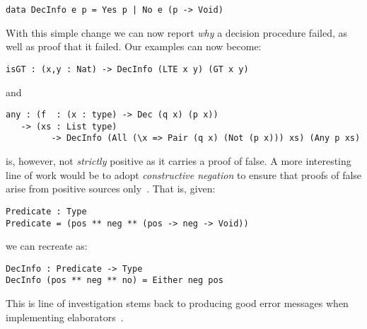 \begin{verbatim}
data DecInfo e p = Yes p | No e (p -> Void)
\end{verbatim}

With this simple change we can now report \emph{why} a decision procedure failed, as well as proof that it failed.
Our examples can now become:

\begin{verbatim}
isGT : (x,y : Nat) -> DecInfo (LTE x y) (GT x y)
\end{verbatim}

\noindent
and

\begin{verbatim}
any : (f  : (x : type) -> Dec (q x) (p x))
   -> (xs : List type)
         -> DecInfo (All (\x => Pair (q x) (Not (p x))) xs) (Any p xs)
\end{verbatim}



 is, however, not \emph{strictly} positive as it carries a proof of false.
A more interesting line of work would be to adopt \emph{constructive negation} to ensure that proofs of false arise from positive sources only~\cite{msfp/Atkey22}.
That is, given:

\begin{verbatim}
Predicate : Type
Predicate = (pos ** neg ** (pos -> neg -> Void))
\end{verbatim}

we can recreate  as:

\begin{verbatim}
DecInfo : Predicate -> Type
DecInfo (pos ** neg ** no) = Either neg pos
\end{verbatim}

This is line of investigation stems back to
producing good error messages when implementing
elaborators~\cite{DBLP:journals/jfp/McBrideM04}.

